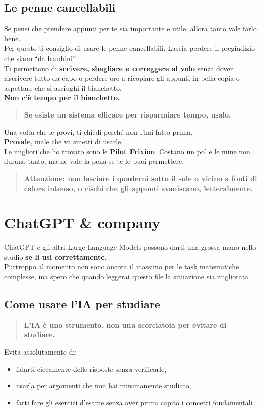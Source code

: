 \documentclass{article}
\begin{document}
\subsection{Le penne cancellabili}
Se pensi che prendere appunti per te sia importante e utile, allora tanto vale farlo bene.\\
Per questo ti consiglio di usare le penne cancellabili. Lascia perdere il pregiudizio che siano ``da bambini''.\\
Ti permettono di \textbf{scrivere, sbagliare e correggere al volo} senza dover riscrivere tutto da capo o perdere ore a ricopiare gli appunti in bella copia o aspettare che si asciughi il bianchetto.\\
\textbf{Non c'è tempo per il bianchetto.}
\begin{quote}
\textbf{Se esiste un sistema efficace per risparmiare tempo, usalo.}
\end{quote}
Una volta che le provi, ti chiedi perché non l'hai fatto prima.\\
\textbf{Provale}, male che va smetti di usarle.\\
Le migliori che ho trovato sono le \textbf{Pilot Frixion}. Costano un po' e le mine non durano tanto, ma ne vale la pena se te le puoi permettere.
\begin{quote}
\textbf{Attenzione: non lasciare i quaderni sotto il sole o vicino a fonti di calore intenso, o rischi che gli appunti svaniscano, letteralmente.}
\end{quote}


\section{ChatGPT & company}
ChatGPT e gli altri Large Language Models possono darti una grossa mano nello studio \textbf{se li usi correttamente.}\\
Purtroppo al momento non sono ancora il massimo per le task matematiche complesse, ma spero che quando leggerai questo file la situazione sia migliorata.


\subsection{Come usare l'IA per studiare}
\begin{quote}
\textbf{L'IA è uno strumento, non una scorciatoia per evitare di studiare.}
\end{quote}
Evita assolutamente di:
\begin{itemize}
\item fidarti ciecamente delle risposte senza verificarle,
\item usarla per argomenti che non hai minimamente studiato,
\item farti fare gli esercizi d'esame senza aver prima capito i concetti fondamentali
\end{itemize}
\end{document}
